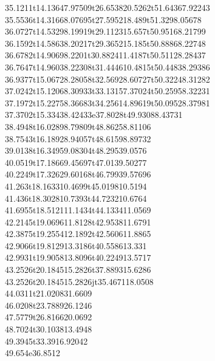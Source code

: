 \documentclass[draft]{article}
\makeatletter
\DeclareRobustCommand{\_}{%
  \ifmmode \nfss@text{\textunderscore}\else \BreakableUnderscore \fi}
\makeatother
\begin{document}
{{35.1211}t{14.1364}{7.97509}t{26.6538}{20.5262}t{51.6436}{7.92243}\\%
{35.5536}t{14.3166}{8.07695}t{27.5952}{18.489}t{51.329}{8.05678}\\%
{36.0727}t{14.5329}{8.19919}t{29.1123}{15.657}t{50.9516}{8.21799}\\%
{36.1592}t{14.5863}{8.20217}t{29.3652}{15.185}t{50.8886}{8.22748}\\%
{36.6782}t{14.9069}{8.2201}t{30.8824}{11.4187}t{50.5112}{8.28437}\\%
{36.7647}t{14.9603}{8.22308}t{31.4446}{10.4815}t{50.4483}{8.29386}\\%
{36.9377}t{15.0672}{8.28058}t{32.5692}{8.60727}t{50.3224}{8.31282}\\%
{37.0242}t{15.1206}{8.30933}t{33.1315}{7.37024}t{50.2595}{8.32231}\\%
{37.1972}t{15.2275}{8.36683}t{34.2561}{4.89619}t{50.0952}{8.37981}\\%
{37.3702}t{15.3343}{8.42433}e{37.8028}t{49.9308}{8.43731}\\%
{38.4948}t{16.0289}{8.79809}t{48.8625}{8.81106}\\%
{38.7543}t{16.1892}{8.94057}t{48.6159}{8.89732}\\%
{39.0138}t{16.3495}{9.08304}t{48.2953}{9.0576}\\%
{40.0519}t{17.1866}{9.45697}t{47.013}{9.50277}\\%
{40.2249}t{17.3262}{9.60168}t{46.7993}{9.57696}\\%
{41.263}t{18.1633}{10.4699}t{45.0198}{10.5194}\\%
{41.436}t{18.3028}{10.7393}t{44.7232}{10.6764}\\%
{41.6955}t{18.5121}{11.1434}t{44.1334}{11.0569}\\%
{42.2145}t{19.0696}{11.8128}t{42.9538}{11.6791}\\%
{42.3875}t{19.2554}{12.1892}t{42.5606}{11.8865}\\%
{42.9066}t{19.8129}{13.3186}t{40.5586}{13.331}\\%
{42.9931}t{19.9058}{13.8096}t{40.2249}{13.5717}\\%
{43.2526}t{20.1845}{15.2826}t{37.8893}{15.6286}\\%
{43.2526}t{20.1845}{15.2826}jt{35.4671}{18.0508}\\%
{44.0311}t{21.0208}{31.6609}\\%
{46.0208}t{23.7889}{26.1246}\\%
{47.5779}t{26.8166}{20.0692}\\%
{48.7024}t{30.1038}{13.4948}\\%
{49.3945}t{33.391}{6.92042}\\%
{49.654}e{36.8512}%
}
\end{document}
